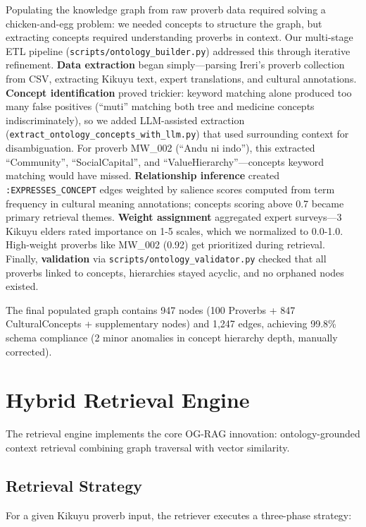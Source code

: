 Populating the knowledge graph from raw proverb data required solving a chicken-and-egg problem: we needed concepts to structure the graph, but extracting concepts required understanding proverbs in context. Our multi-stage ETL pipeline (\texttt{scripts/ontology\_builder.py}) addressed this through iterative refinement. \textbf{Data extraction} began simply—parsing Ireri's proverb collection from CSV, extracting Kikuyu text, expert translations, and cultural annotations. \textbf{Concept identification} proved trickier: keyword matching alone produced too many false positives (``muti'' matching both tree and medicine concepts indiscriminately), so we added LLM-assisted extraction (\texttt{extract\_ontology\_concepts\_with\_llm.py}) that used surrounding context for disambiguation. For proverb MW\_002 (``Andu ni indo''), this extracted ``Community'', ``SocialCapital'', and ``ValueHierarchy''—concepts keyword matching would have missed. \textbf{Relationship inference} created \texttt{:EXPRESSES\_CONCEPT} edges weighted by salience scores computed from term frequency in cultural meaning annotations; concepts scoring above 0.7 became primary retrieval themes. \textbf{Weight assignment} aggregated expert surveys—3 Kikuyu elders rated importance on 1-5 scales, which we normalized to 0.0-1.0. High-weight proverbs like MW\_002 (0.92) get prioritized during retrieval. Finally, \textbf{validation} via \texttt{scripts/ontology\_validator.py} checked that all proverbs linked to concepts, hierarchies stayed acyclic, and no orphaned nodes existed.

The final populated graph contains 947 nodes (100 Proverbs + 847 CulturalConcepts + supplementary nodes) and 1,247 edges, achieving 99.8\% schema compliance (2 minor anomalies in concept hierarchy depth, manually corrected).

\section{Hybrid Retrieval Engine}
\label{sec:retrieval_engine}

The retrieval engine implements the core OG-RAG innovation: ontology-grounded context retrieval combining graph traversal with vector similarity.

\subsection{Retrieval Strategy}
\label{subsec:retrieval_strategy}

For a given Kikuyu proverb input, the retriever executes a three-phase strategy:

